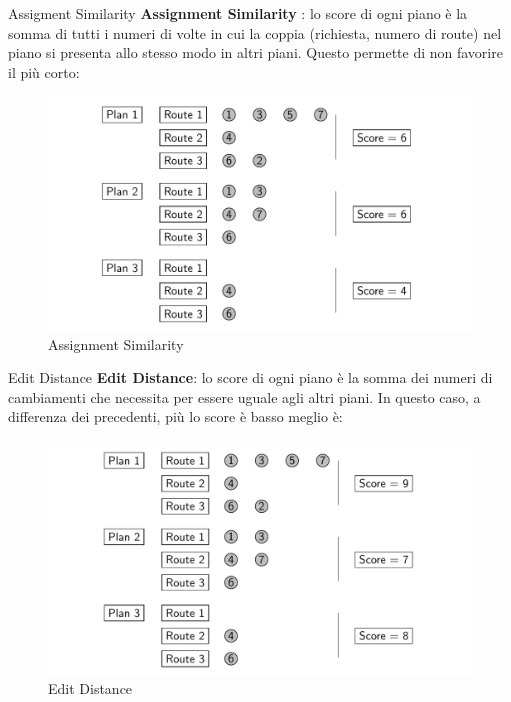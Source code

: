 \documentclass[10pt]{beamer}
\begin{document}
    \begin{frame}{Assigment Similarity}
        \textbf{Assignment Similarity} : lo score di ogni piano è la somma di tutti i numeri di volte in cui la coppia (richiesta, numero di route) nel piano si presenta allo stesso modo in altri piani. Questo permette di non favorire il più corto:
        \begin{figure}[h!]
            \centering
            \includegraphics[scale=0.22]{Images/AssignmentSimilarity.png}
            \caption{Assignment Similarity}
            \label{fig:AssignmentSimilarity}
        \end{figure}
    \end{frame}

    \begin{frame}{Edit Distance}
        \textbf{Edit Distance}: lo score di ogni piano è la somma dei numeri di cambiamenti che necessita per essere uguale agli altri piani. In questo caso, a differenza dei precedenti, più lo score è basso meglio è:
        \begin{figure}[h!]
            \centering
            \includegraphics[scale=0.22]{Images/EditDistance.png}
            \caption{Edit Distance}
            \label{fig:EditDistance}
        \end{figure}
    \end{frame}
\end{document}
